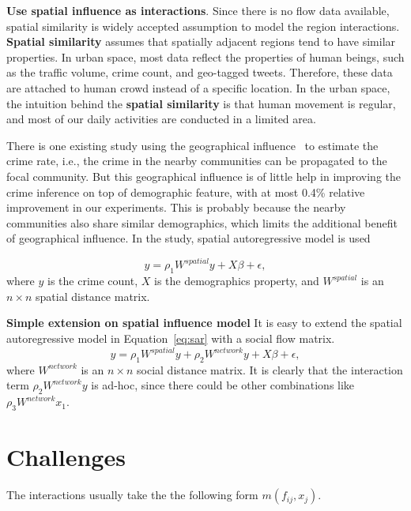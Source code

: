 \textbf{Use spatial influence as interactions}.
Since there is no flow data available, spatial similarity is widely accepted assumption to model the region interactions. \textbf{Spatial similarity} assumes that spatially adjacent regions tend to have similar properties. In urban space, most data reflect the properties of human beings, such as the traffic volume, crime count, and geo-tagged tweets. Therefore, these data are attached to human crowd instead of a specific location. 
In the urban space, the intuition behind the \textbf{spatial similarity} is that human movement is regular, and most of our daily activities are conducted in a limited area.

There is one existing study using the geographical influence~\cite{Ans02} to estimate the crime rate, i.e., the crime in the nearby communities can be propagated to the focal community. But this geographical influence is of little help in improving the crime inference on top of demographic feature, with at most 0.4\% relative improvement in our experiments. This is probably because the nearby communities also share similar demographics, which limits the additional benefit of geographical influence. In the study, spatial autoregressive model is used

\begin{equation}
\label{eq:sar}
y = \rho_1 W^{spatial} y + X \beta + \epsilon,
\end{equation}
where $y$ is the crime count, $X$ is the demographics property, and $W^{spatial}$ is an $n\times n$ spatial distance matrix.



\textbf{Simple extension on spatial influence model}
It is easy to extend the spatial autoregressive model in Equation~\ref{eq:sar} with a social flow matrix.
\begin{equation}
\label{eq:sar2}
y = \rho_1 W^{spatial} y + \rho_2 W^{network} y + X \beta + \epsilon,
\end{equation}
where $W^{network}$ is an $n\times n$ social distance matrix.
It is clearly that the interaction term $\rho_2 W^{network} y$ is ad-hoc, since there could be other combinations like $\rho_3 W^{network} x_1$.





\section{Challenges}

The interactions usually take the the following form $m(f_{ij}, x_j)$.

